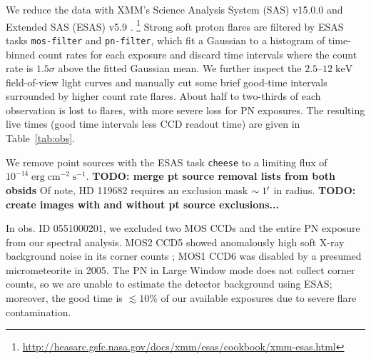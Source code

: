 \documentclass[preprint2,tighten,trackchanges]{aastex6}
\newcommand*{\mt}{\mathrm}
\newcommand*{\unit}[1]{\;\mt{#1}}  %
\begin{document}


We reduce the data with XMM's Science Analysis System (SAS) v15.0.0 and
Extended SAS (ESAS) v5.9 \citep{snowden2008, kuntz2008}.
\footnote{\url{http://heasarc.gsfc.nasa.gov/docs/xmm/esas/cookbook/xmm-esas.html}}
Strong soft proton flares are filtered by ESAS tasks \texttt{mos-filter} and
\texttt{pn-filter}, which fit a Gaussian to a histogram of time-binned count
rates for each exposure and discard time intervals where the count rate is
$1.5\sigma$ above the fitted Gaussian mean.  %
We further inspect the $2.5$--$12 \unit{keV}$ field-of-view light curves and
manually cut some brief good-time intervals surrounded by higher count rate
flares.
About half to two-thirds of each observation is lost to flares, with more
severe loss for PN exposures.
The resulting live times (good time intervals less CCD readout time) are
given in Table~\ref{tab:obs}.

We remove point sources with the ESAS task \texttt{cheese}
to a limiting flux of $10^{-14} \unit{erg\;cm^{-2}\;s^{-1}}$.
\textbf{TODO: merge pt source removal lists from both obsids}  %
Of note, HD 119682 requires an exclusion mask $\sim 1\mbox{$^\prime$}$ in radius.
\textbf{TODO: create images with and without pt source exclusions...}

In obs. ID 0551000201, we excluded two MOS CCDs and the entire PN exposure from
our spectral analysis.
MOS2 CCD5 showed anomalously high soft X-ray background noise in its corner
counts \citep[cf.][]{kuntz2008}; MOS1 CCD6 was disabled by a presumed
micrometeorite in 2005.
The PN in Large Window mode does not collect corner counts, so we are unable to
estimate the detector background using ESAS; moreover, the good time is
$\lesssim 10\%$ of our available exposures due to severe flare contamination.
\end{document}
